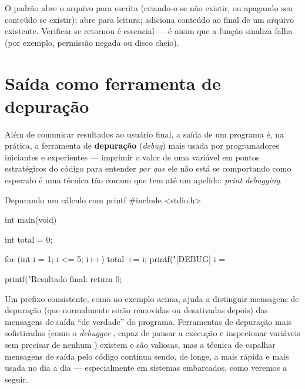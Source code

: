 O padrão  abre o arquivo para escrita (criando-o se não existir, ou apagando seu conteúdo se existir);  abre para leitura;  adiciona conteúdo ao final de um arquivo existente. Verificar se  retornou  é essencial — é assim que a função sinaliza falha (por exemplo, permissão negada ou disco cheio).

\section{Saída como ferramenta de depuração}
\label{sec:printf-debug}

Além de comunicar resultados ao usuário final, a saída de um programa é, na prática, a ferramenta de \textbf{depuração} (\emph{debug}) mais usada por programadores iniciantes e experientes — imprimir o valor de uma variável em pontos estratégicos do código para entender \emph{por que} ele não está se comportando como esperado é uma técnica tão comum que tem até um apelido: \emph{print debugging}.

\begin{codigoc}{Depurando um cálculo com printf}
#include <stdio.h>

int main(void) {
    int total = 0;

    for (int i = 1; i <= 5; i++) {
        total += i;
        printf("[DEBUG] i = %
    }

    printf("Resultado final: %
    return 0;
}
\end{codigoc}

\begin{dica}
Um prefixo consistente, como \code{[DEBUG]} no exemplo acima, ajuda a distinguir mensagens de depuração (que normalmente serão removidas ou desativadas depois) das mensagens de saída ``de verdade'' do programa. Ferramentas de depuração mais sofisticadas (como o \emph{debugger} , capaz de pausar a execução e inspecionar variáveis sem precisar de nenhum ) existem e são valiosas, mas a técnica de espalhar mensagens de saída pelo código continua sendo, de longe, a mais rápida e mais usada no dia a dia — especialmente em sistemas embarcados, como veremos a seguir.
\end{dica}

